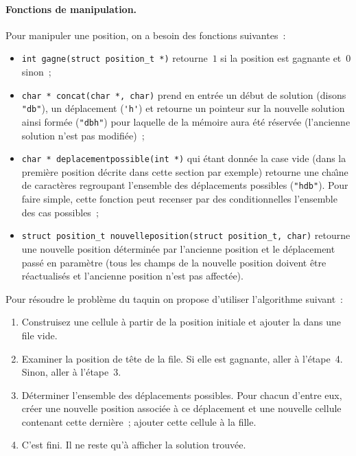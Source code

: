\paragraph{Fonctions de manipulation.}
Pour manipuler une position, on a besoin des fonctions suivantes~:
\begin{itemize}
\item \verb?int gagne(struct position_t *)? retourne~$1$ si la
  position est gagnante et~$0$ sinon~;
\item \verb?char * concat(char *, char)? prend en entr\'ee un d\'ebut
  de solution (disons \verb?"db"?), un d\'eplacement (\verb?'h'?) et
  retourne un pointeur sur la nouvelle solution ainsi form\'ee
  (\verb?"dbh"?) pour laquelle de la m\'emoire aura \'et\'e
  r\'eserv\'ee (l'ancienne solution n'est pas modifi\'ee)~;
\item \verb?char * deplacementpossible(int *)? qui \'etant donn\'ee
  la case vide (dans la premi\`ere position d\'ecrite dans cette
  section par exemple) retourne une cha\^\i{}ne de caract\`eres
  regroupant l'ensemble des d\'eplacements possibles (\verb?"hdb"?).
  Pour faire simple, cette fonction peut recenser par des
  conditionnelles l'ensemble des cas possibles~;
\item \verb?struct position_t nouvelleposition(struct position_t, char)? %
  retourne une nouvelle position d\'etermin\'ee par l'ancienne
  position et le d\'eplacement pass\'e en param\`etre (tous les
  champs de la nouvelle position doivent \^etre r\'eactualis\'es et
  l'ancienne position n'est pas affect\'ee).
\end{itemize}
\par\medskip
Pour r\'esoudre le probl\`eme du taquin on propose d'utiliser
l'algorithme suivant~:
\begin{enumerate}
  
\item Construisez une cellule \`a partir de la position initiale et
  ajouter la dans une file vide.
\item Examiner la position de t\^ete de la file. Si elle est gagnante,
  aller \`a l'\'etape~4. Sinon, aller \`a l'\'etape~3.
\item D\'eterminer l'ensemble des d\'eplacements possibles. Pour
  chacun d'entre eux, cr\'eer une nouvelle position associ\'ee \`a ce
  d\'eplacement et une nouvelle cellule contenant cette derni\`ere~;
  ajouter cette cellule \`a la fille.
\item C'est fini. Il ne reste qu'\`a afficher la solution trouv\'ee.
\end{enumerate}
